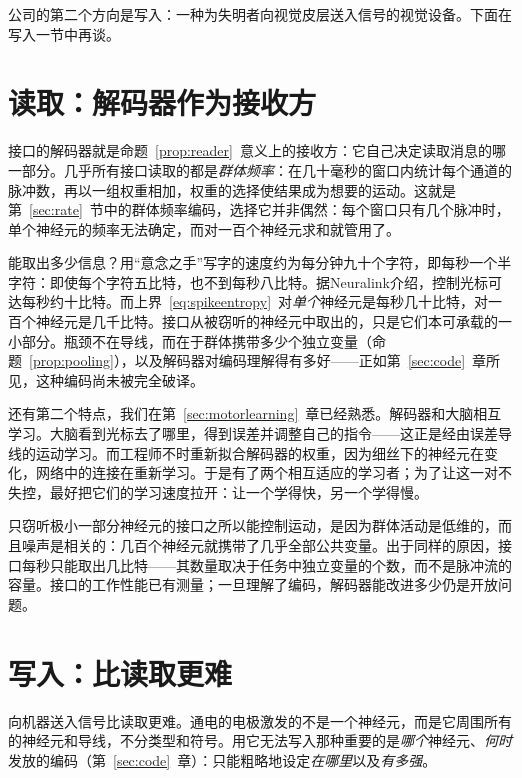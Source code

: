 公司的第二个方向是写入：一种为失明者向视觉皮层送入信号的视觉设备。下面在写入一节中再谈。

\section{读取：解码器作为接收方}

接口的解码器就是命题~\ref{prop:reader}~意义上的接收方：它自己决定读取消息的哪一部分。几乎所有接口读取的都是\emph{群体频率}：在几十毫秒的窗口内统计每个通道的脉冲数，再以一组权重相加，权重的选择使结果成为想要的运动。这就是第~\ref{sec:rate}~节中的群体频率编码，选择它并非偶然：每个窗口只有几个脉冲时，单个神经元的频率无法确定，而对一百个神经元求和就管用了。

能取出多少信息？用“意念之手”写字的速度约为每分钟九十个字符\cite{Willett2021}，即每秒一个半字符：即使每个字符五比特，也不到每秒八比特。据Neuralink介绍，控制光标可达每秒约十比特。而上界~\eqref{eq:spikeentropy}~对\emph{单个}神经元是每秒几十比特，对一百个神经元是几千比特。接口从被窃听的神经元中取出的，只是它们本可承载的一小部分。瓶颈不在导线，而在于群体携带多少个独立变量（命题~\ref{prop:pooling}），以及解码器对编码理解得有多好——正如第~\ref{sec:code}~章所见，这种编码尚未被完全破译。

还有第二个特点，我们在第~\ref{sec:motorlearning}~章已经熟悉。解码器和大脑相互学习。大脑看到光标去了哪里，得到误差并调整自己的指令——这正是经由误差导线的运动学习。而工程师不时重新拟合解码器的权重，因为细丝下的神经元在变化，网络中的连接在重新学习。于是有了两个相互适应的学习者；为了让这一对不失控，最好把它们的学习速度拉开：让一个学得快，另一个学得慢。

\begin{keyblock}
\begin{proposition}[为什么覆盖一千个神经元的探针能工作]
\label{prop:probe}
只窃听极小一部分神经元的接口之所以能控制运动，是因为群体活动是低维的，而且噪声是相关的：几百个神经元就携带了几乎全部公共变量。出于同样的原因，接口每秒只能取出几比特——其数量取决于任务中独立变量的个数，而不是脉冲流的容量。接口的工作性能已有测量；一旦理解了编码，解码器能改进多少仍是开放问题。
\end{proposition}
\end{keyblock}

\section{写入：比读取更难}

向机器送入信号比读取更难。通电的电极激发的不是一个神经元，而是它周围所有的神经元和导线，不分类型和符号。用它无法写入那种重要的是\emph{哪个}神经元、\emph{何时}发放的编码（第~\ref{sec:code}~章）：只能粗略地设定\emph{在哪里}以及\emph{有多强}。

